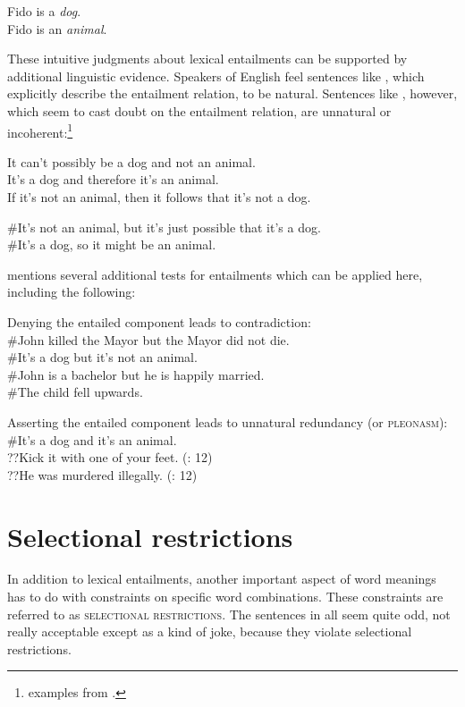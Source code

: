 \ea \label{ex:7.4}
\ea Fido is a \textit{dog}.\\
\ex Fido is an \textit{animal}.
                       \z
\z


These intuitive judgments about lexical entailments can be supported by additional linguistic evidence. Speakers of English feel sentences like , which explicitly describe the entailment relation, to be natural. Sentences like , however, which seem to cast doubt on the entailment relation, are unnatural or incoherent:\footnote{examples from \citet[14]{Cruse1986}.}


\ea \label{ex:7.5}
\ea It can’t possibly be a dog and not an animal.\\
\ex It’s a dog and therefore it’s an animal.\\
\ex If it’s not an animal, then it follows that it’s not a dog.
                       \z
\z

\ea \label{ex:7.6}
\ea \#It’s not an animal, but it’s just possible that it’s a dog.\\
\ex \#It’s a dog, so it might be an animal.
                       \z
\z


\citet[12]{Cruse1986} mentions several additional tests for entailments which can be applied here, including the following:


\ea \label{ex:7.7}
Denying the entailed component leads to contradiction:\\
\ea \#John killed the Mayor but the Mayor did not die.\\
\ex \#It’s a dog but it’s not an animal.\\
\ex \#John is a bachelor but he is happily married.\\
\ex \#The child fell upwards.
\z
                       \z

\ea \label{ex:7.8}
Asserting the entailed component leads to unnatural redundancy (or \textsc{pleonasm}):\\
\ea \#It’s a dog and it’s an animal.\\
\ex ??Kick it with one of your feet.  (\citealt{Cruse1986}: 12)\\
\ex ??He was murdered illegally.  (\citealt{Cruse1986}: 12)
                       \z
\z

\section{Selectional restrictions}\label{sec:7.3}

In addition to lexical entailments, another important aspect of word meanings has to do with constraints on specific word combinations. These constraints are referred to as \textsc{selectional restrictions}. The sentences in  all seem quite odd, not really acceptable except as a kind of joke, because they violate selectional restrictions.


